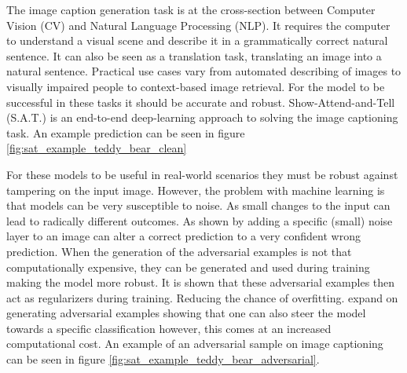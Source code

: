 
The image caption generation task is at the cross-section between Computer Vision (CV) and Natural Language Processing (NLP). It requires the computer to understand a visual scene and describe it in a grammatically correct natural sentence. It can also be seen as a translation task, translating an image into a natural sentence. Practical use cases vary from automated describing of images to visually impaired people \cite{mazzoni_2019} to context-based image retrieval. For the model to be successful in these tasks it should be accurate and robust. Show-Attend-and-Tell (S.A.T.) \cite{xu2016show} is an end-to-end deep-learning approach to solving the image captioning task. An example prediction can be seen in figure \ref{fig:sat_example_teddy_bear_clean}

For these models to be useful in real-world scenarios they must be robust against tampering on the input image. However, the problem with machine learning is that models can be very susceptible to noise. As small changes to the input can lead to radically different outcomes. As shown by \citeauthor{goodfellow2015explaining} adding a specific (small) noise layer to an image can alter a correct prediction to a very confident wrong prediction. When the generation of the adversarial examples is not that computationally expensive, they can be generated and used during training making the model more robust. It is shown that these adversarial examples then act as regularizers during training. Reducing the chance of overfitting. \citeauthor{Kurakin} expand on generating adversarial examples showing that one can also steer the model towards a specific classification however, this comes at an increased computational cost. An example of an adversarial sample on image captioning can be seen in figure \ref{fig:sat_example_teddy_bear_adversarial}.

